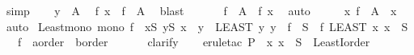 \begin{isabellebody}
\ simp\isanewline
\ \ \isamarkupfalse%
\ {\isacartoucheopen}y\ {\isasymin}\ A{\isacartoucheclose}\ \isamarkupfalse%
\ {\isachardoublequoteopen}f\ x\ {\isasymin}\ f\ {\isacharbackquote}{\kern0pt}\ A{\isachardoublequoteclose}\ \isamarkupfalse%
\ blast\isanewline
\ \ \isamarkupfalse%
\ {\isacharasterisk}{\kern0pt}\ \isamarkupfalse%
\ {\isachardoublequoteopen}f\ {\isacharbackquote}{\kern0pt}\ A\ {\isacharequal}{\kern0pt}\ {\isacharbraceleft}{\kern0pt}f\ x{\isacharbraceright}{\kern0pt}{\isachardoublequoteclose}\ \isamarkupfalse%
\ auto\isanewline
\ \ \isamarkupfalse%
\ \isamarkupfalse%
\ {\isachardoublequoteopen}{\isasymexists}{\isacharbang}{\kern0pt}x{\isachardot}{\kern0pt}\ f\ {\isacharbackquote}{\kern0pt}\ A\ {\isacharequal}{\kern0pt}\ {\isacharbraceleft}{\kern0pt}x{\isacharbraceright}{\kern0pt}{\isachardoublequoteclose}\ \isamarkupfalse%
\ auto\isanewline
{}\isamarkupfalse%
%
\endisatagproof
{\isafoldproof}%
%
\isadelimproof
%
\endisadelimproof
%
\isadelimdocument
%
\endisadelimdocument
%
\isatagdocument
%
\isamarkuptrue%
%
\endisatagdocument
{\isafolddocument}%
%
\isadelimdocument
%
\endisadelimdocument
{}\isamarkupfalse%
\ Least{\isacharunderscore}{\kern0pt}mono{\isacharcolon}{\kern0pt}\ {\isachardoublequoteopen}mono\ f\ {\isasymLongrightarrow}\ {\isasymexists}x{\isasymin}S{\isachardot}{\kern0pt}\ {\isasymforall}y{\isasymin}S{\isachardot}{\kern0pt}\ x\ {\isasymle}\ y\ {\isasymLongrightarrow}\ {\isacharparenleft}{\kern0pt}LEAST\ y{\isachardot}{\kern0pt}\ y\ {\isasymin}\ f\ {\isacharbackquote}{\kern0pt}\ S{\isacharparenright}{\kern0pt}\ {\isacharequal}{\kern0pt}\ f\ {\isacharparenleft}{\kern0pt}LEAST\ x{\isachardot}{\kern0pt}\ x\ {\isasymin}\ S{\isacharparenright}{\kern0pt}{\isachardoublequoteclose}\isanewline
\ \ \ f\ {\isacharcolon}{\kern0pt}{\isacharcolon}{\kern0pt}\ {\isachardoublequoteopen}{\isacharprime}{\kern0pt}a{\isacharcolon}{\kern0pt}{\isacharcolon}{\kern0pt}order\ {\isasymRightarrow}\ {\isacharprime}{\kern0pt}b{\isacharcolon}{\kern0pt}{\isacharcolon}{\kern0pt}order{\isachardoublequoteclose}\isanewline
\ \ %
\isanewline
%
\isadelimproof
\ \ %
\endisadelimproof
%
\isatagproof
{}\isamarkupfalse%
\ clarify\isanewline
\ \ \isamarkupfalse%
\ {\isacharparenleft}{\kern0pt}erule{\isacharunderscore}{\kern0pt}tac\ P\ {\isacharequal}{\kern0pt}\ {\isachardoublequoteopen}{\isasymlambda}x{\isachardot}{\kern0pt}\ x\ {\isasymin}\ S{\isachardoublequoteclose}\ \ LeastI{}{\isacharunderscore}{\kern0pt}order{\isacharparenright}{\kern0pt}\isanewline

\end{isabellebody}

